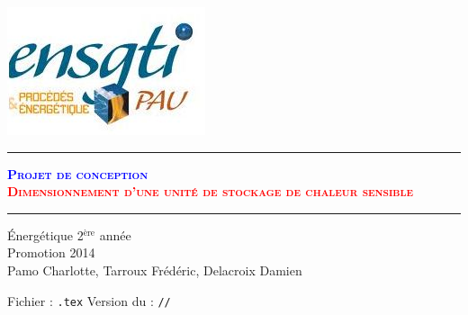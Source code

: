 \documentclass[a4paper,french,twoside,openright]{report}
\begin{document}
\setlength{\parindent}{0mm}



\begin{titlepage}
	\begin{center}
		\includegraphics[scale=1]{photo/ensgti.jpg} 
	\end{center}
	
	\begin{center}
		\rule[1em]{0.9\textwidth}{1mm}
		\Huge\scshape\bfseries
		\textcolor{blue}{Projet de conception}
		\\
		\textcolor{red}{Dimensionnement d'une unité de stockage de chaleur sensible}\\
		\rule{0.9\textwidth}{1mm}

	\end{center}
	\begin{center}
		\vspace{2.5cm}
		{\Large \'Energétique 2$^{\textrm{ère}}$ année}\\
		\vspace{2cm}
		{\large Promotion 2014}
		\vspace{1cm}
		\\
		{\large Pamo Charlotte, Tarroux Frédéric, Delacroix Damien}
	\end{center}
	
	{\small Fichier : \texttt{\jobname.tex}
	\hfill
	\hfill
	Version du : \texttt{\number\day/\number\month/\number\year} }
\end{titlepage}

\pagestyle{fancy}
\renewcommand{\chaptermark}[1]{\markboth{#1}{}}

\tableofcontents
\listoffigures
\listoftables











\end{document}
